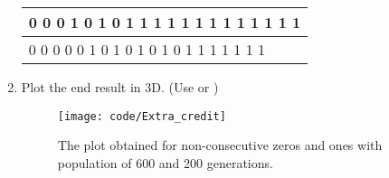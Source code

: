 \documentclass[11pt, a4paper]{article}
\begin{document}
\begin{enumerate}
\begin{table}[http]
\begin{tabular}{|l|}
			0     0     0     1     0     1     0     1     1     1     1     1     1     1     1     1     1     1     1     1 \\ \hline
			0     0     0     0     0     1     0     1     0     1     0     1     0     1     1     1     1     1     1     1 \\ \hline
		\end{tabular}
	\end{table}
	\item Plot the end result in 3D. (Use  or )
			\begin{figure}
			\centering
			\texttt{[image: code/Extra\_credit]}
			\caption{The plot obtained for non-consecutive zeros and ones with population of 600 and 200 generations.}
			\label{extracredit}
		\end{figure}
\end{enumerate}
\end{document}
